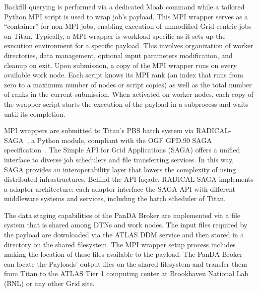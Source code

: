 Backfill querying is performed via a dedicated Moab command while a tailored
Python MPI script is used to wrap job's payload. This MPI wrapper serves as a
``container'' for non-MPI jobs, enabling execution of unmodified Grid-centric
jobs on Titan. Typically, a MPI wrapper is workload-specific as it sets up the
execution environment for a specific payload. This involves organization of
worker directories, data management, optional input parameters modification, and
cleanup on exit. Upon submission, a copy of the MPI wrapper runs on every
available work node. Each script knows its MPI rank (an index that runs from
zero to a maximum number of nodes or script copies) as well as the total number
of ranks in the current submission. When activated on worker nodes, each copy of
the wrapper script starts the execution of the payload in a subprocess and waits
until its completion.

MPI wrappers are submitted to Titan's PBS batch system via
RADICAL-SAGA~\cite{radical-saga}, a Python module, compliant with the OGF GFD.90
SAGA specification~\cite{saga-spec}. The Simple API for Grid Applications (SAGA)
offers a unified interface to diverse job schedulers and file transferring
services. In this way, SAGA provides an interoperability layer that lowers the
complexity of using distributed infrastructures. Behind the API façade,
RADICAL-SAGA implements a adaptor architecture: each adaptor interface the SAGA
API with different middleware systems and services, including the batch
scheduler of Titan.

The data staging capabilities of the PanDA Broker are implemented via a file
system that is shared among DTNs and work nodes. The input files required by the
payload are downloaded via the ATLAS DDM service and then stored in a directory
on the shared filesystem. The MPI wrapper setup process includes making the
location of these files available to the payload. The PanDA Broker can locate
the Payloads' output files on the shared filesystem and transfer them from Titan
to the ATLAS Tier 1 computing center at Brookhaven National Lab (BNL) or any
other Grid site.

